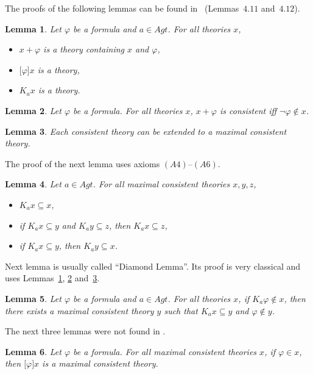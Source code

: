 \documentclass{article}[12pt]
\newtheorem{lemma}{Lemma}
\renewcommand{\phi}{\varphi}
\begin{document}
The proofs of the following lemmas can be found in~\cite{balbianietal:2008} (Lemmas~$4.11$ and~$4.12$).
\begin{lemma}\label{lem_7}
Let $\phi$ be a formula and $a\in Agt$.
For all theories $x$,
\begin{itemize}
\item $x+\phi$ is a theory containing $x$ and $\phi$,
\item $\lbrack\phi\rbrack x$ is a theory,
\item $K_{a}x$ is a theory.
\end{itemize}
\end{lemma}
\begin{lemma}\label{lem_7bis}
Let $\phi$ be a formula.
For all theories $x$, $x+\phi$ is consistent iff $\neg\phi\not\in x$.
\end{lemma}
\begin{lemma}\label{lem_9}
Each consistent theory can be extended to a maximal consistent theory.
\end{lemma}
The proof of the next lemma uses axioms $(A4)$--$(A6)$.
\begin{lemma}\label{equivalence}
Let $a\in Agt$.
For all maximal consistent theories $x,y,z$,
\begin{itemize}
\item $K_{a}x\subseteq x$,
\item if $K_{a}x\subseteq y$ and $K_{a}y\subseteq z$, then $K_{a}x\subseteq z$,
\item if $K_{a}x\subseteq y$, then $K_{a}y\subseteq x$.
\end{itemize}
\end{lemma}
Next lemma is usually called ``Diamond Lemma''.
Its proof is very classical and uses Lemmas~\ref{lem_7}, \ref{lem_7bis} and~\ref{lem_9}.
\begin{lemma}\label{diamond_lemma}
Let $\phi$ be a formula and $a\in Agt$.
For all theories $x$, if $K_{a}\phi\not\in x$, then there exists a maximal consistent theory $y$ such that $K_{a}x\subseteq y$ and $\phi\not\in y$.
\end{lemma}
The next three lemmas were not found in \cite{balbianietal:2008}.
\begin{lemma}\label{lem_mcs}
Let $\phi$ be a formula.
For all maximal consistent theories $x$, if $\phi\in x$, then $\lbrack\phi\rbrack x$ is a maximal consistent theory.
\end{lemma}
\end{document}
